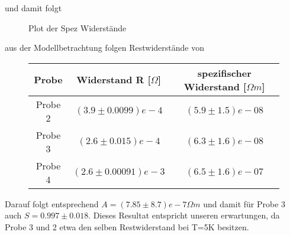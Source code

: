     und damit folgt
    \begin{figure}[H]
        \centering
        \caption{Plot der Spez Widerstände}
        \label{spec resistance plot}
    \end{figure}
    aus der Modellbetrachtung folgen Restwiderstände von
    \begin{figure}[H]
        \centering
        \begin{tabular}{c|c|c}
            Probe & Widerstand R [$\Omega$] &spezifischer Widerstand [$\Omega m$] \\
            \hline
            Probe 2 & $(3.9\pm 0.0099)e-4 $ & $(5.9\pm 1.5)e-08$ \\
            Probe 3 & $(2.6\pm 0.015)e-4 $ & $(6.3\pm 1.6)e-08$ \\
            Probe 4 & $(2.6\pm 0.00091)e-3 $ & $(6.5\pm 1.6)e-07$ \\
        \end{tabular}
    \end{figure}
    Darauf folgt entsprechend $A=(7.85\pm8.7)e-7 \Omega m$ und damit für Probe 3 auch $S=0.997 \pm 0.018$. Dieses Resultat
    entspricht unseren erwartungen, da Probe 3 und 2 etwa den selben Restwiderstand bei T=5K besitzen.